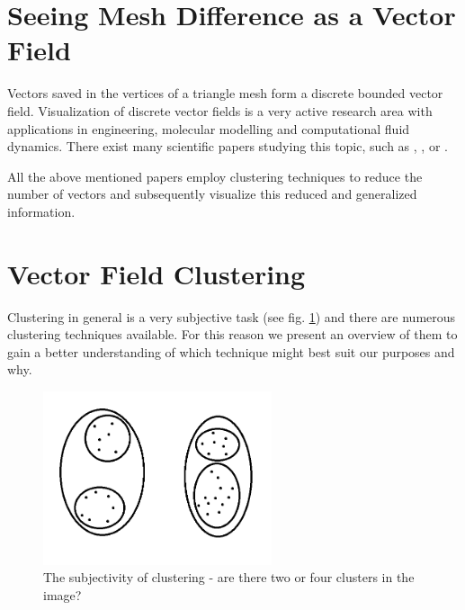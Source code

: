 \section{Seeing Mesh Difference as a Vector Field}

Vectors saved in the vertices of a triangle mesh form a discrete bounded vector field. Visualization of discrete vector fields is a very active research area with applications in engineering, molecular modelling and computational fluid dynamics. There exist many scientific papers studying this topic, such as \citet{Telea99}, \citet{Garcke00}, \citet{Du04} or \citet{Peng12}.

All the above mentioned papers employ clustering techniques to reduce the number of vectors and subsequently visualize this reduced and generalized information.

\section{Vector Field Clustering}

Clustering in general is a very subjective task (see fig. \ref{fig:clustering_subjectivity}) and there are numerous clustering techniques available. For this reason we present an overview of them to gain a better understanding of which technique might best suit our purposes and why.

\begin{figure}[h]
\centering
\includegraphics[width=0.6\textwidth]{./img/clustering_subjectivity.png}
\caption{The subjectivity of clustering - are there two or four clusters in the image?}
\label{fig:clustering_subjectivity}
\end{figure}

